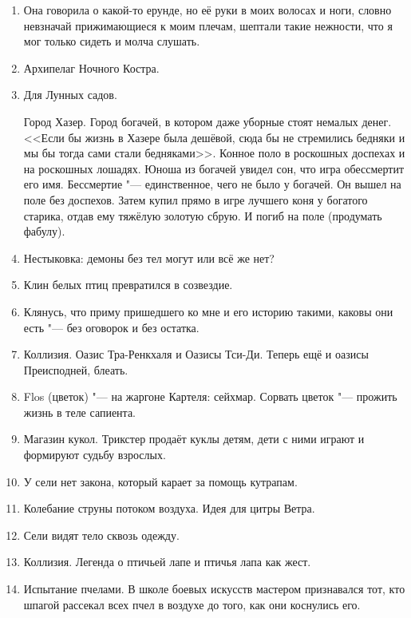 \documentclass[a4paper,10pt]{book}
\begin{document}
\begin{enumerate}
\item Она говорила о какой-то ерунде, но её руки в моих волосах и ноги, словно невзначай прижимающиеся к моим плечам, шептали такие нежности, что я мог только сидеть и молча слушать.

\item Архипелаг Ночного Костра.

\item Для Лунных садов.

Город Хазер. Город богачей, в котором даже уборные стоят немалых денег. <<Если бы жизнь в Хазере была дешёвой, сюда бы не стремились бедняки и мы бы тогда сами стали бедняками>>. Конное поло в роскошных доспехах и на роскошных лошадях. Юноша из богачей увидел сон, что игра обессмертит его имя. Бессмертие "--- единственное, чего не было у богачей. Он вышел на поле без доспехов. Затем купил прямо в игре лучшего коня у богатого старика, отдав ему тяжёлую золотую сбрую. И погиб на поле (продумать фабулу).

\item Нестыковка: демоны без тел могут или всё же нет?

\item Клин белых птиц превратился в созвездие.

\item Клянусь, что приму пришедшего ко мне и его историю такими, каковы они есть "--- без оговорок и без остатка.

\item Коллизия. Оазис Тра-Ренкхаля и Оазисы Тси-Ди. Теперь ещё и оазисы Преисподней, блеать.

\item Flos (цветок) "--- на жаргоне Картеля: сейхмар. Сорвать цветок "--- прожить жизнь в теле сапиента.

\item Магазин кукол. Трикстер продаёт куклы детям, дети с ними играют и формируют судьбу взрослых.

\item У сели нет закона, который карает за помощь кутрапам.

\item Колебание струны потоком воздуха. Идея для цитры Ветра.

\item Сели видят тело сквозь одежду.

\item Коллизия. Легенда о птичьей лапе и птичья лапа как жест.

\item Испытание пчелами. В школе боевых искусств мастером признавался тот, кто 
шпагой рассекал всех пчел в воздухе до того, как они коснулись его.


\end{enumerate}
\end{document}
